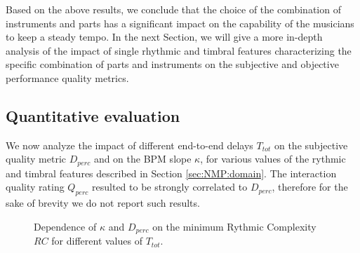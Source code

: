Based on the above results, we conclude that the choice of the combination of instruments and parts has a significant impact on the capability of the musicians to keep a steady tempo. 
In the next Section, we will give a more in-depth analysis of the impact of single rhythmic and timbral features characterizing the specific combination of parts and instruments on the subjective and objective performance quality metrics.

\subsection{Quantitative evaluation}
We now analyze the impact of different end-to-end delays $T_{tot}$ on the subjective quality metric $D_{perc}$ and on the BPM slope $\kappa$, for various values of the rythmic and timbral features described in Section \ref{sec:NMP:domain}. The interaction quality rating $Q_{perc}$ resulted to be strongly correlated to $D_{perc}$, therefore for the sake of brevity we do not report such results.


\begin{figure}[!tb]
\begin{flushright}
    \hfil
\end{flushright}
\caption{Dependence of $\kappa$ and $D_{perc}$ on the minimum Rythmic Complexity $RC$ for different values of $T_{tot}$.}
\label{fig:NMP:minRC}
\end{figure}


